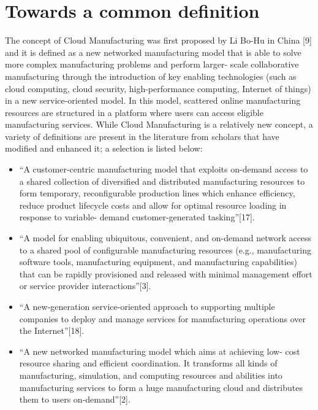 \section{Towards a common definition}
The concept of Cloud Manufacturing was first proposed by Li Bo-Hu in China [9] and it is defined as a new networked manufacturing model that is able to solve more complex manufacturing problems and perform larger- scale collaborative manufacturing through the introduction of key enabling technologies (such as cloud computing, cloud security, high-performance computing, Internet of things) in a new service-oriented model. In this model, scattered online manufacturing resources are structured in a platform where users can access eligible manufacturing services. While Cloud Manufacturing is a relatively new concept, a variety of definitions are present in the literature from scholars that have modified and enhanced it; a selection is listed below:
\begin{itemize}
    \item “A customer-centric manufacturing model that exploits on-demand access to a shared collection of diversified and distributed manufacturing resources to form temporary, reconfigurable production lines which enhance efficiency, reduce product lifecycle costs and allow for optimal resource loading in response to variable- demand customer-generated tasking”[17].
    \item “A model for enabling ubiquitous, convenient, and on-demand network access to a shared pool of configurable manufacturing resources (e.g., manufacturing software tools, manufacturing equipment, and manufacturing capabilities) that can be rapidly provisioned and released with minimal management effort or service provider interactions”[3].
    \item “A new-generation service-oriented approach to supporting multiple companies to deploy and manage services for manufacturing operations over the Internet”[18].
    \item “A new networked manufacturing model which aims at achieving low- cost resource sharing and efficient coordination. It transforms all kinds of manufacturing, simulation, and computing resources and abilities into manufacturing services to form a huge manufacturing cloud and distributes them to users on-demand”[2].
\end{itemize}

